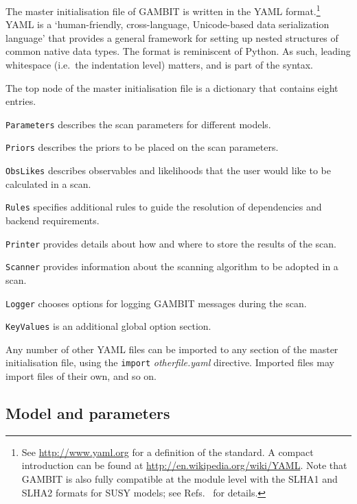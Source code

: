 \documentclass[pdftex,twocolumn,epjc3_preprint,runningheads]{svjour3}
\renewcommand{\_}{\discretionary{\underscore}{}{\underscore}}
\newcommand\yaml[1]{{\lstset{style=yaml}\lstinline!#1!\lstset{style=cpp}}}
\newcommand{\metavarf}[1]{\textit{\color{darkgreen}\footnotesize\textrm{#1}}}
\newcommand{\metavar}{\metavarf}
\newcommand{\ie}{i.e.\ }
\newcommand{\gambit}{\textsf{GAMBIT}\xspace}
\newcommand{\GB}{\gambit}
\newcommand\Python{\textsf{Python}\xspace}
\newcommand\python{\Python}
\newcommand\YAML{\textsf{YAML}\xspace}
\renewcommand{\url}[1]{\href{#1}{#1}}
\begin{document}
The master initialisation file of \GB is written in the \YAML
format.\footnote{See \url{http://www.yaml.org} for a definition of the
standard.  A compact introduction can be found at
\url{http://en.wikipedia.org/wiki/YAML}.  Note that \GB is also fully compatible at the module level with the SLHA1 \cite{Skands:2003cj} and SLHA2 \cite{Allanach:2008qq} formats for SUSY models; see Refs.\ \cite{SDPBit,DarkBit,ColliderBit,FlavBit} for details.}  \YAML is a `human-friendly, cross-language, Unicode-based data serialization language' that provides a general
framework for setting up nested structures of common native data types.  The
format is reminiscent of \python.  As
such, leading whitespace (\ie the indentation level) matters, and is part of the
syntax.

The top node of the master initialisation file is a dictionary that contains
eight entries.
\begin{description}
\item \yaml{Parameters} describes the scan
parameters for different models.
\item \yaml{Priors} describes the priors
to be placed on the scan parameters.
\item \yaml{ObsLikes} describes
observables and likelihoods that the user would like to be calculated in a scan.
\item \yaml{Rules} specifies additional rules to guide the resolution
of dependencies and backend requirements.
\item \yaml{Printer} provides details about how and where to
store the results of the scan.
\item \yaml{Scanner} provides information about the scanning algorithm to be adopted in a scan.
\item \yaml{Logger} chooses options for logging \GB messages during the scan.
\item \yaml{KeyValues} is an additional global option section.
\end{description}

Any number of other \YAML files can be imported to any section of the master initialisation file, using the {\footnotesize\color{black}\ttfamily{!}}\yaml{import} \metavar{other\_file.yaml} directive.  Imported files may import files of their own, and so on.

\subsection{Model and parameters}
\end{document}
